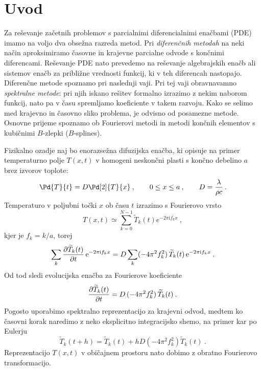 \documentclass{article}
\begin{document}
\section{Uvod}
Za reševanje začetnih problemov s parcialnimi diferencialnimi
enačbami (PDE) imamo na voljo dva obsežna razreda metod.
Pri {\sl diferenčnih metodah\/} na neki način aproksimiramo
časovne in krajevne parcialne odvode s končnimi diferencami.
Reševanje PDE nato prevedemo na reševanje algebrajskih enačb
ali sistemov enačb za približne vrednosti funkcij, ki v teh
diferencah nastopajo.  Diferenčne metode spoznamo pri
naslednji vaji.  Pri tej vaji obravnavamno {\sl spektralne metode\/}:
pri njih iskano rešitev formalno izrazimo z nekim naborom funkcij,
nato pa v času spremljamo koeficiente v takem razvoju.  Kako se
selimo med krajevno in časovno sliko problema, je odvisno
od posamezne metode.  Osnovne prijeme spoznamo ob Fourierovi
metodi in  metodi končnih elementov s kubičnimi $B$-zlepki ($B$-splines).

Fizikalno ozadje naj bo enorazsežna difuzijska enačba,
ki opisuje na primer temperaturno polje $T(x,t)$ v homogeni
neskončni plasti s končno debelino $a$ brez izvorov toplote:
\begin{equation*}
\Pd{T}{t} = D\Pd[2]{T}{x}
 \>, \qquad 0\le x \le a \>, \qquad D={\lambda\over \rho c} \>.
\end{equation*}
Temperaturo v poljubni točki $x$ ob času $t$ izrazimo
s Fourierovo vrsto
\begin{equation*}
T(x,t) \simeq \sum_{k=0}^{N-1} \widetilde{T}_k(t)
e^{-2\pi\mathrm{i} f_k x} \>,
\end{equation*}
kjer je $f_k = k/a$, torej
\begin{equation*}
\sum_k {\partial\widetilde{T}_k(t)\over\partial t}\,
\mathrm{e}^{-2\pi\mathrm{i} f_k x} =
D \sum_k (-4\pi^2 f_k^2) \, \widetilde{T}_k(t) \,
\mathrm{e}^{-2\pi\mathrm{i} f_k x} \>.
\end{equation*}
Od tod sledi evolucijska enačba za Fourierove koeficiente
\begin{equation}
{\partial\widetilde{T}_k(t)\over\partial t} =
D \, (-4\pi^2 f_k^2) \, \widetilde{T}_k(t) \>.
\label{eq:num}
\end{equation}
Pogosto uporabimo spektralno reprezentacijo za krajevni odvod,
medtem ko časovni korak naredimo z neko eksplicitno integracijsko
shemo, na primer kar po Eulerju
\begin{equation}
\widetilde{T}_k(t+h) = \widetilde{T}_k(t)
+ h D (-4\pi^2 f_k^2) \widetilde{T}_k(t) \>.
\label{ffteuler}
\end{equation}
Reprezentacijo $T(x,t)$ v običajnem prostoru nato dobimo
z obratno Fourierovo transformacijo.
\end{document}
